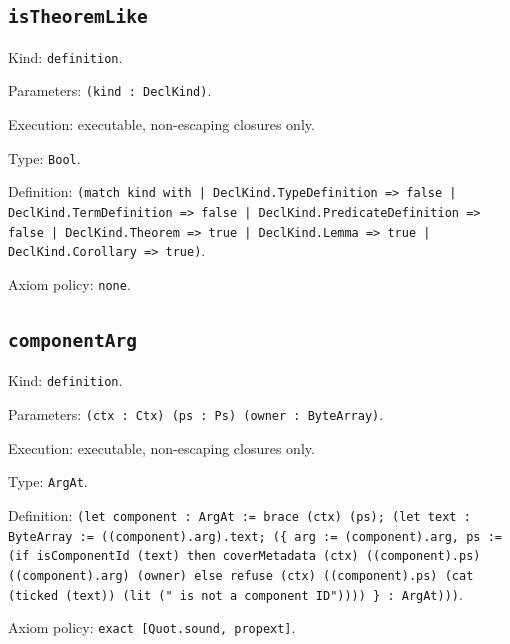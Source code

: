 \documentclass[11pt]{article}
\begin{document}
\subsection*{\texttt{isTheoremLike}}
\noindent Kind: \texttt{definition}.\par
\noindent Parameters: \texttt{(kind : DeclKind)}.\par
\noindent Execution: executable, non-escaping closures only.\par
\noindent Type: \texttt{Bool}.\par
\noindent Definition: \texttt{(match kind with | DeclKind.TypeDefinition => false | DeclKind.TermDefinition => false | DeclKind.PredicateDefinition => false | DeclKind.Theorem => true | DeclKind.Lemma => true | DeclKind.Corollary => true)}.\par
\noindent Axiom policy: \texttt{none}.\par
\subsection*{\texttt{componentArg}}
\noindent Kind: \texttt{definition}.\par
\noindent Parameters: \texttt{(ctx : Ctx) (ps : Ps) (owner : ByteArray)}.\par
\noindent Execution: executable, non-escaping closures only.\par
\noindent Type: \texttt{ArgAt}.\par
\noindent Definition: \texttt{(let component : ArgAt := brace (ctx) (ps); (let text : ByteArray := ((component).arg).text; (\{ arg := (component).arg, ps := (if isComponentId (text) then coverMetadata (ctx) ((component).ps) ((component).arg) (owner) else refuse (ctx) ((component).ps) (cat (ticked (text)) (lit (" is not a component ID")))) \} : ArgAt)))}.\par
\noindent Axiom policy: \texttt{exact [Quot.sound, propext]}.\par
\end{document}
